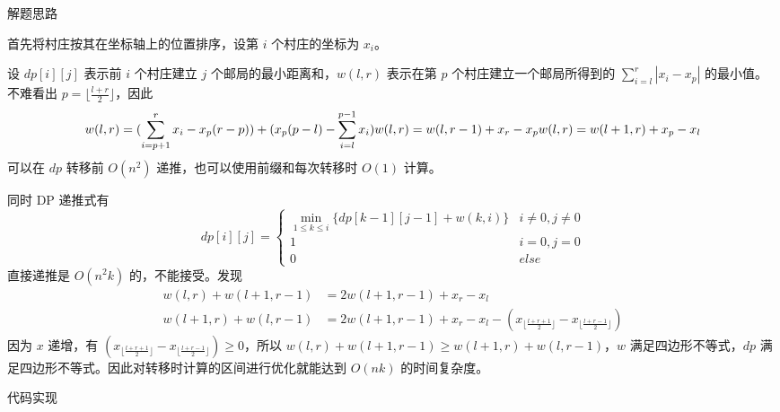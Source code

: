 解题思路

首先将村庄按其在坐标轴上的位置排序，设第 \(i\) 个村庄的坐标为 \(x_i\)。

设 \(dp[i][j]\) 表示前 \(i\) 个村庄建立 \(j\)
个邮局的最小距离和，\(w(l,r)\) 表示在第 \(p\) 个村庄建立一个邮局所得到的
\(\sum_{i=l}^r|x_i-x_p|\) 的最小值。不难看出
\(p=\lfloor \frac{l+r}{2}\rfloor\)，因此 \[
w(l,r)=(\sum_{i=p+1}^rx_i-x_p(r-p))+(x_p(p-l)-\sum_{i=l}^{p-1}x_i)\\
w(l,r)=w(l,r-1)+x_r-x_p\\
w(l,r)=w(l+1,r)+x_p-x_l\\
\] 可以在 \(dp\) 转移前 \(O(n^2)\) 递推，也可以使用前缀和每次转移时
\(O(1)\) 计算。

同时 DP 递推式有 \[
dp[i][j]=
\begin{cases}
\min_{1\le k\le i}\{dp[k-1][j-1]+w(k,i)\}&i\not=0,j\not=0\\[2ex]
1&i=0,j=0\\[2ex]
0&else
\end{cases}
\] 直接递推是 \(O(n^2k)\) 的，不能接受。发现 \[
\begin{aligned}
w(l,r)+w(l+1,r-1)&=2w(l+1,r-1)+x_r-x_l\\
w(l+1,r)+w(l,r-1)&=2w(l+1,r-1)+x_r-x_l-(x_{\lfloor \frac{l+r+1}{2}\rfloor}-x_{\lfloor \frac{l+r-1}{2}\rfloor})
\end{aligned}
\] 因为 \(x\) 递增，有
\((x_{\lfloor \frac{l+r+1}{2}\rfloor}-x_{\lfloor \frac{l+r-1}{2}\rfloor})\ge0\)，所以
\(w(l,r)+w(l+1,r-1)\ge w(l+1,r)+w(l,r-1)\)，\(w\)
满足四边形不等式，\(dp\)
满足四边形不等式。因此对转移时计算的区间进行优化就能达到 \(O(nk)\)
的时间复杂度。

代码实现

